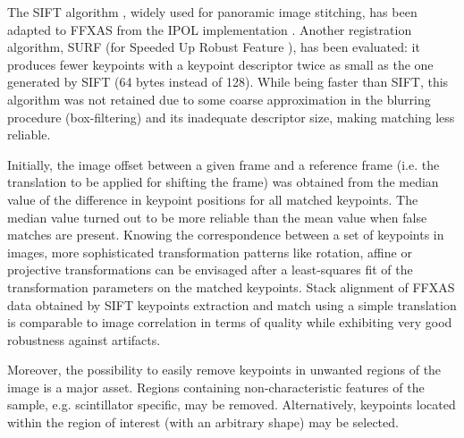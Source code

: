 \documentclass[preprint]{iucr}
\begin{document}
The SIFT algorithm \cite{Lowe99,Lowe04}, widely used for panoramic image
stitching, has been adapted to FFXAS from the IPOL implementation \cite{ASIFT}.
Another registration algorithm, SURF (for Speeded Up Robust Feature
\cite{surf}), has been evaluated: it produces fewer keypoints with a keypoint
descriptor twice as small as the one generated by SIFT (64 bytes instead
of 128).
While being faster than SIFT, this algorithm was not
retained due to some coarse approximation in the blurring procedure
(box-filtering) and its inadequate descriptor size, making matching less
reliable.

Initially, the image offset between a given frame and a reference frame (i.e.
the translation to be applied for shifting the frame) was obtained from the
median value of the difference in keypoint positions for all matched keypoints.
The median value turned out to be more reliable than the mean value when
false matches are present.
Knowing the correspondence between a set of keypoints in images, more
sophisticated transformation patterns like rotation, affine or projective
transformations can be envisaged after a least-squares fit of the
transformation parameters on the matched keypoints.
Stack alignment of FFXAS data obtained by SIFT keypoints extraction and match
using a simple translation is comparable to image correlation in terms of
quality while exhibiting very good robustness against artifacts.

Moreover, the possibility to easily remove keypoints in unwanted regions of
the image is a major asset.
Regions containing non-characteristic features of the sample, e.g. scintillator
specific, may be removed. Alternatively, keypoints located within the
region of interest (with an arbitrary shape) may be selected.
\end{document}
